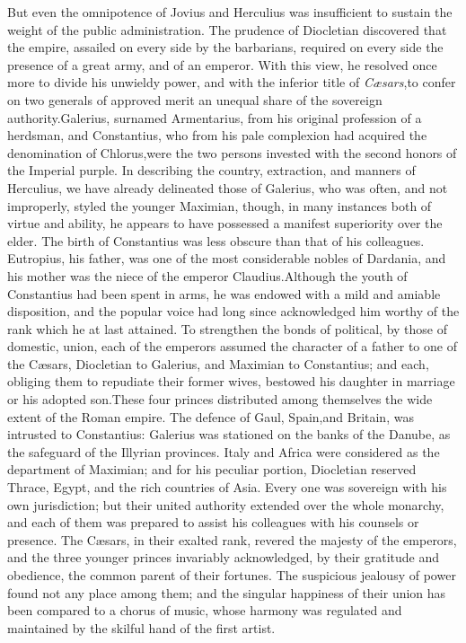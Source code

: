 But even the omnipotence of Jovius and Herculius was insufficient
to sustain the weight of the public administration. The prudence
of Diocletian discovered that the empire, assailed on every side
by the barbarians, required on every side the presence of a great
army, and of an emperor. With this view, he resolved once more to
divide his unwieldy power, and with the inferior title of
\textit{Cæsars},\footnotemark[901] to confer on two generals of approved merit an
unequal share of the sovereign authority.\footnotemark[10] Galerius, surnamed
Armentarius, from his original profession of a herdsman, and
Constantius, who from his pale complexion had acquired the
denomination of Chlorus,\footnotemark[11] were the two persons invested with
the second honors of the Imperial purple. In describing the
country, extraction, and manners of Herculius, we have already
delineated those of Galerius, who was often, and not improperly,
styled the younger Maximian, though, in many instances both of
virtue and ability, he appears to have possessed a manifest
superiority over the elder. The birth of Constantius was less
obscure than that of his colleagues. Eutropius, his father, was
one of the most considerable nobles of Dardania, and his mother
was the niece of the emperor Claudius.\footnotemark[12] Although the youth of
Constantius had been spent in arms, he was endowed with a mild
and amiable disposition, and the popular voice had long since
acknowledged him worthy of the rank which he at last attained. To
strengthen the bonds of political, by those of domestic, union,
each of the emperors assumed the character of a father to one of
the Cæsars, Diocletian to Galerius, and Maximian to Constantius;
and each, obliging them to repudiate their former wives, bestowed
his daughter in marriage or his adopted son.\footnotemark[13] These four
princes distributed among themselves the wide extent of the Roman
empire. The defence of Gaul, Spain,\footnotemark[14] and Britain, was intrusted
to Constantius: Galerius was stationed on the banks of the
Danube, as the safeguard of the Illyrian provinces. Italy and
Africa were considered as the department of Maximian; and for his
peculiar portion, Diocletian reserved Thrace, Egypt, and the rich
countries of Asia. Every one was sovereign with his own
jurisdiction; but their united authority extended over the whole
monarchy, and each of them was prepared to assist his colleagues
with his counsels or presence. The Cæsars, in their exalted rank,
revered the majesty of the emperors, and the three younger
princes invariably acknowledged, by their gratitude and
obedience, the common parent of their fortunes. The suspicious
jealousy of power found not any place among them; and the
singular happiness of their union has been compared to a chorus
of music, whose harmony was regulated and maintained by the
skilful hand of the first artist.\footnotemark[15]

